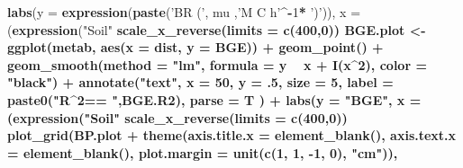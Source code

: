 \documentclass[]{article}
\newenvironment{Shaded}{\begin{snugshade}}{\end{snugshade}}
\newcommand{\KeywordTok}[1]{\textcolor[rgb]{0.13,0.29,0.53}{\textbf{#1}}}
\newcommand{\DataTypeTok}[1]{\textcolor[rgb]{0.13,0.29,0.53}{#1}}
\newcommand{\DecValTok}[1]{\textcolor[rgb]{0.00,0.00,0.81}{#1}}
\newcommand{\StringTok}[1]{\textcolor[rgb]{0.31,0.60,0.02}{#1}}
\newcommand{\OperatorTok}[1]{\textcolor[rgb]{0.81,0.36,0.00}{\textbf{#1}}}
\newcommand{\NormalTok}[1]{#1}
\begin{document}
\begin{Shaded}
\begin{Highlighting}[]
{\StringTok{  }\KeywordTok{labs}\NormalTok{(}\DataTypeTok{y =} \KeywordTok{expression}\NormalTok{(}\KeywordTok{paste}\NormalTok{(}\StringTok{'BR ('}\NormalTok{, mu ,}\StringTok{'M C h'}\OperatorTok{^-}\DecValTok{1}\OperatorTok{*}\StringTok{ ')'}\NormalTok{)), }
       \DataTypeTok{x =}\NormalTok{ (}\KeywordTok{expression}\NormalTok{(}\StringTok{"Soil"} \OperatorTok{%
\StringTok{  }\KeywordTok{scale_x_reverse}\NormalTok{(}\DataTypeTok{limits =} \KeywordTok{c}\NormalTok{(}\DecValTok{400}\NormalTok{,}\DecValTok{0}\NormalTok{))}
\NormalTok{BGE.plot <-}\StringTok{ }\KeywordTok{ggplot}\NormalTok{(metab, }\KeywordTok{aes}\NormalTok{(}\DataTypeTok{x =}\NormalTok{ dist, }\DataTypeTok{y =}\NormalTok{ BGE)) }\OperatorTok{+}\StringTok{ }
\StringTok{  }\KeywordTok{geom_point}\NormalTok{() }\OperatorTok{+}\StringTok{ }
\StringTok{  }\KeywordTok{geom_smooth}\NormalTok{(}\DataTypeTok{method =} \StringTok{"lm"}\NormalTok{, }\DataTypeTok{formula =}\NormalTok{ y }\OperatorTok{~}\StringTok{ }\NormalTok{x }\OperatorTok{+}\StringTok{ }\KeywordTok{I}\NormalTok{(x}\OperatorTok{^}\DecValTok{2}\NormalTok{), }\DataTypeTok{color =} \StringTok{"black"}\NormalTok{) }\OperatorTok{+}
\StringTok{  }\KeywordTok{annotate}\NormalTok{(}\StringTok{"text"}\NormalTok{, }\DataTypeTok{x =} \DecValTok{50}\NormalTok{, }\DataTypeTok{y =}\NormalTok{ .}\DecValTok{5}\NormalTok{, }\DataTypeTok{size =} \DecValTok{5}\NormalTok{, }\DataTypeTok{label =} \KeywordTok{paste0}\NormalTok{(}\StringTok{"R^2== "}\NormalTok{,BGE.R2), }\DataTypeTok{parse =}\NormalTok{ T ) }\OperatorTok{+}
\StringTok{  }\KeywordTok{labs}\NormalTok{(}\DataTypeTok{y =} \StringTok{"BGE"}\NormalTok{, }
       \DataTypeTok{x =}\NormalTok{ (}\KeywordTok{expression}\NormalTok{(}\StringTok{"Soil"} \OperatorTok{%
\StringTok{  }\KeywordTok{scale_x_reverse}\NormalTok{(}\DataTypeTok{limits =} \KeywordTok{c}\NormalTok{(}\DecValTok{400}\NormalTok{,}\DecValTok{0}\NormalTok{))}
\KeywordTok{plot_grid}\NormalTok{(BP.plot }\OperatorTok{+}\StringTok{ }\KeywordTok{theme}\NormalTok{(}\DataTypeTok{axis.title.x =} \KeywordTok{element_blank}\NormalTok{(), }\DataTypeTok{axis.text.x =} \KeywordTok{element_blank}\NormalTok{(), }
                          \DataTypeTok{plot.margin =} \KeywordTok{unit}\NormalTok{(}\KeywordTok{c}\NormalTok{(}\DecValTok{1}\NormalTok{, }\DecValTok{1}\NormalTok{, }\OperatorTok{-}\DecValTok{1}\NormalTok{, }\DecValTok{0}\NormalTok{), }\StringTok{"cm"}\NormalTok{)), }
}}}
\end{Highlighting}
\end{Shaded}
\end{document}
